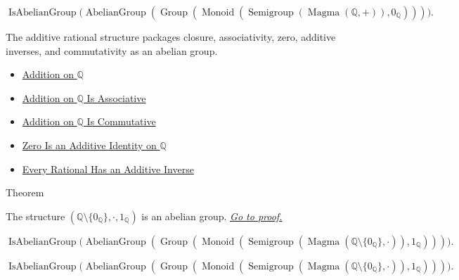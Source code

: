 \begin{remark*}
\[
\operatorname{IsAbelianGroup}
\bigl(\operatorname{AbelianGroup}(
\operatorname{Group}(\operatorname{Monoid}(
\operatorname{Semigroup}(\operatorname{Magma}(\mathbb{Q},+)),
0_{\mathbb{Q}})))\bigr).
\]
\end{remark*}

\begin{remark*}[Interpretation]
The additive rational structure packages closure, associativity, zero, additive
inverses, and commutativity as an abelian group.
\end{remark*}

\begin{dependencies}
\begin{itemize}
\item \hyperref[def:addition-on-q-classes]{Addition on $\mathbb{Q}$}
  \item \hyperref[thm:addition-on-q-associative]{Addition on $\mathbb{Q}$ Is Associative}
  \item \hyperref[thm:addition-on-q-commutative]{Addition on $\mathbb{Q}$ Is Commutative}
  \item \hyperref[thm:zero-additive-identity-on-q]{Zero Is an Additive Identity on $\mathbb{Q}$}
  \item \hyperref[thm:every-rational-has-additive-inverse]{Every Rational Has an Additive Inverse}
\end{itemize}
\end{dependencies}

\begin{theorembox}{Theorem}
\begin{theorem}
\label{thm:q-nonzero-multiplicative-abelian-group}
The structure
$(\mathbb{Q}\setminus\{0_{\mathbb{Q}}\},\cdot,1_{\mathbb{Q}})$ is an abelian
group.
\hyperref[prf:q-nonzero-multiplicative-abelian-group]{\textit{Go to proof.}}
\end{theorem}
\end{theorembox}

\begin{remark*}
\[
\operatorname{IsAbelianGroup}
\bigl(\operatorname{AbelianGroup}(
\operatorname{Group}(\operatorname{Monoid}(
\operatorname{Semigroup}(\operatorname{Magma}(
\mathbb{Q}\setminus\{0_{\mathbb{Q}}\},\cdot)),
1_{\mathbb{Q}})))\bigr).
\]
\end{remark*}

\begin{remark*}
\[
\operatorname{IsAbelianGroup}
\bigl(\operatorname{AbelianGroup}(
\operatorname{Group}(\operatorname{Monoid}(
\operatorname{Semigroup}(\operatorname{Magma}(
\mathbb{Q}\setminus\{0_{\mathbb{Q}}\},\cdot)),
1_{\mathbb{Q}})))\bigr).
\]
\end{remark*}

